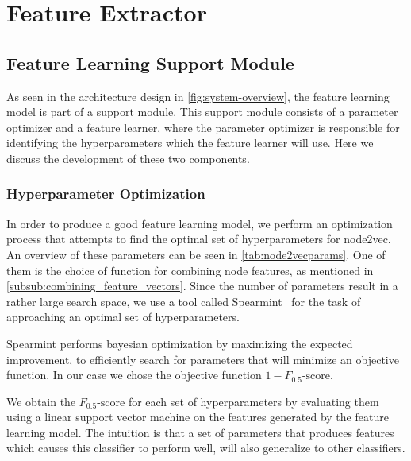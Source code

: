\section{Feature Extractor}\label{feature_extractor}





\subsection{Feature Learning Support Module}
As seen in the architecture design in \cref{fig:system-overview}, the feature learning model is part of a support module. This support module consists of a parameter optimizer and a feature learner, where the parameter optimizer is responsible for identifying the hyperparameters which the feature learner will use. Here we discuss the development of these two components.

\subsubsection{Hyperparameter Optimization}\label{sec:hyperopt}
In order to produce a good feature learning model, we perform an optimization process that attempts to find the optimal set of hyperparameters for node2vec. An overview of these parameters can be seen in \cref{tab:node2vecparams}. One of them is the choice of function for combining node features, as mentioned in \cref{subsub:combining_feature_vectors}. Since the number of parameters result in a rather large search space, we use a tool called Spearmint~\cite{snoek2012practical} for the task of approaching an optimal set of hyperparameters.

Spearmint performs bayesian optimization by maximizing the expected improvement, to efficiently search for parameters that will minimize an objective function. In our case we chose the objective function $1- F_{0.5}\text{-score}$.

We obtain the $F_{0.5}\text{-score}$ for each set of hyperparameters by evaluating them using a linear support vector machine on the features generated by the feature learning model. The intuition is that a set of parameters that produces features which causes this classifier to perform well, will also generalize to other classifiers.

